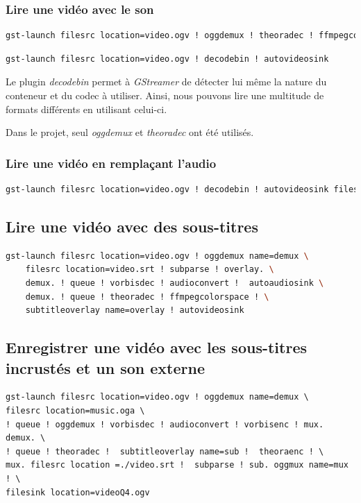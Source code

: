 \documentclass[a4paper, 11pt]{article}
\begin{document}
	\subsubsection{Lire une vidéo avec le son}
	\begin{lstlisting}[numbers=none,language=sh, caption=Lire une vidéo -- Uniquement pour les fichier \texttt{.ogv}]
gst-launch filesrc location=video.ogv ! oggdemux ! theoradec ! ffmpegcolorspace ! autovideosink
	\end{lstlisting}
	\begin{lstlisting}[numbers=none,language=sh, caption=Lire une vidéo -- Pour tous les formats audio-vidéos]
gst-launch filesrc location=video.ogv ! decodebin ! autovideosink
	\end{lstlisting}
	\begin{remarque}
		Le plugin \textit{decodebin} permet à \textit{GStreamer} de détecter lui même la nature du conteneur et du codec à utiliser. Ainsi, nous pouvons lire une multitude de
		formats différents en utilisant celui-ci.

		Dans le projet, seul \textit{oggdemux} et \textit{theoradec} ont été utilisés.
	\end{remarque}
	\subsubsection{Lire une vidéo en remplaçant l'audio}
	\begin{lstlisting}[language=sh, caption=Lire une vidéo avec le son de source différente]
gst-launch filesrc location=video.ogv ! decodebin ! autovideosink filesrc location=music.oga ! decodebin ! autoaudiosink
	\end{lstlisting}
	\subsection{Lire une vidéo avec des sous-titres}
	\begin{lstlisting}[language=Bash, caption=Lire une vidéo avec des sous-titres \texttt{.srt}]	
gst-launch filesrc location=video.ogv ! oggdemux name=demux \ 
	filesrc location=video.srt ! subparse ! overlay. \
	demux. ! queue ! vorbisdec ! audioconvert !  autoaudiosink \
	demux. ! queue ! theoradec ! ffmpegcolorspace ! \
	subtitleoverlay name=overlay ! autovideosink
\end{lstlisting}
	\subsection{Enregistrer une vidéo avec les sous-titres incrustés et un son externe}
	\begin{lstlisting}[language=Sh, caption=Enregistrer une vidéo avec l'audio \texttt{music.oga}\, l'image \texttt{video.ogv} et les sous-titres]
gst-launch filesrc location=video.ogv ! oggdemux name=demux \
filesrc location=music.oga \
! queue ! oggdemux ! vorbisdec ! audioconvert ! vorbisenc ! mux. demux. \
! queue ! theoradec !  subtitleoverlay name=sub !  theoraenc ! \
mux. filesrc location =./video.srt !  subparse ! sub. oggmux name=mux ! \
filesink location=videoQ4.ogv
	\end{lstlisting}
\end{document}
